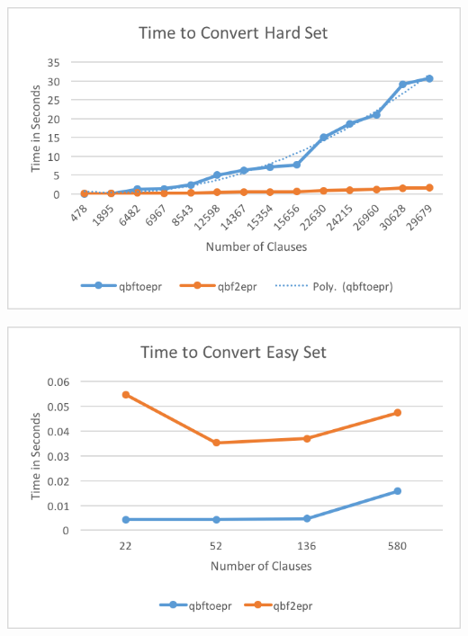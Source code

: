 \begin{center}
\includegraphics{qbftoeprvsqbf2eprhard.png}
\end{center}

\begin{center}
\includegraphics{qbftoeprvsqbf2epreasy.png}
\end{center}
